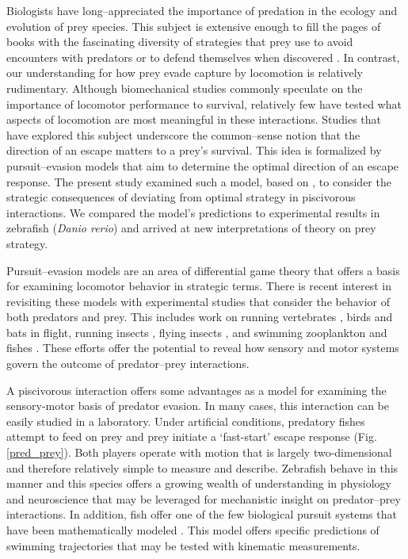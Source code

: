 \documentclass[12pt]{article}
\begin{document}
Biologists have long--appreciated the importance of predation in the ecology and evolution of prey species. This subject is extensive enough to fill the pages of books with the fascinating diversity of strategies that prey use to avoid encounters with predators \citep[e.g.][]{Ruxton:2004vb} or to defend themselves when discovered \citep[e.g.][]{Emlen:2014wb, Evans:1990va}. 
In contrast, our understanding for how prey evade capture by locomotion is relatively rudimentary. Although biomechanical studies commonly speculate on the importance of locomotor performance to survival, relatively few have tested what aspects of locomotion are most meaningful in these interactions. 
Studies that have explored this subject \citep[reviewed by][]{Domenici:2011tv} underscore the common--sense notion that the direction of an escape matters to a prey's survival. This idea is formalized by pursuit--evasion models that aim to determine the optimal direction of an escape response. 
The present study examined such a model, based on \cite{Weihs:1984tb}, to consider the strategic consequences of deviating from optimal strategy in piscivorous interactions. We compared the model's predictions to experimental results in zebrafish (\textit{Danio rerio}) \citep{Stewart:2014cm} and arrived at new interpretations of theory on prey strategy.

Pursuit--evasion models are an area of differential game theory that offers a basis for examining locomotor behavior in strategic terms. There is recent interest in revisiting these models \citep[e.g.][]{Howland:1974, Weihs:1984tb} with experimental studies that consider the behavior of both predators and prey. 
This includes work on running vertebrates \citep[e.g.][]{Wilson:2014fd}, birds \citep[e.g.][]{Kullberg:1998ur} and bats \citep[e.g.][]{Ghose:2006dk} in flight, running insects \citep{Domenici:2008kra}, flying insects \citep[e.g.][]{Combes:2012eta}, and swimming zooplankton \citep[e.g.][]{Arnott:1999wx, Heuch:2007kk} and fishes \citep[e.g.][]{Domenici:2000un}. 
These efforts offer the potential to reveal how sensory and motor systems govern the outcome of predator--prey interactions. 

A piscivorous interaction offers some advantages as a model for examining the sensory-motor basis of predator evasion. In many cases, this interaction can be easily studied in a laboratory. 
Under artificial conditions, predatory fishes attempt to feed on prey and prey initiate a `fast-start' escape response (Fig. \ref{pred_prey}). Both players operate with motion that is largely two-dimensional and therefore relatively simple to measure and describe. 
Zebrafish behave in this manner \citep{Stewart:2013bh} and this species offers a growing wealth of understanding in physiology and neuroscience \citep[e.g.][]{McLean:2011gi, Briggs:2002uf} that may be leveraged for mechanistic insight on predator--prey interactions. 
In addition, fish offer one of the few biological pursuit systems that have been mathematically modeled \citep{Weihs:1984tb}. This model offers specific predictions of swimming trajectories that may be tested with kinematic measurements. 
\end{document}

